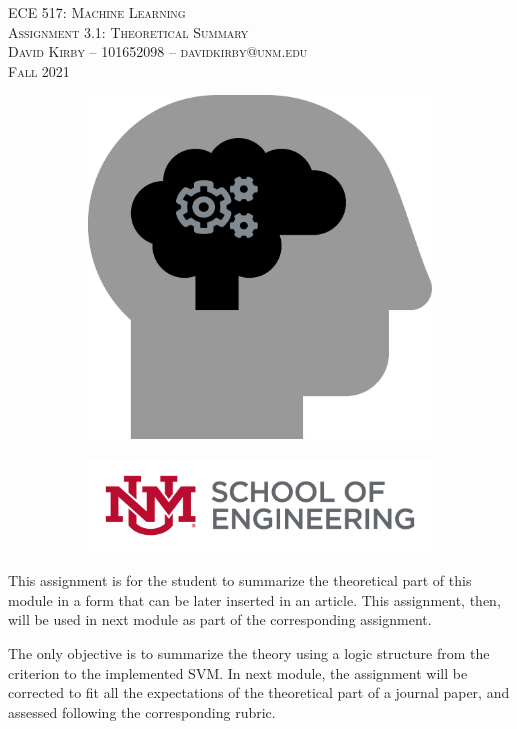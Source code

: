 \documentclass[11pt]{article}
\begin{document}
\setmainfont{SF Pro Text}
\setsansfont{SF Pro Text}
\setmonofont{SF Mono}
\renewcommand{\familydefault}{\sfdefault}


\thispagestyle{empty}
\begin{titlepage}
\vspace*{\fill}
\begin{center}
\textsc{\Huge{ECE 517: Machine Learning}}\\[3em]
\textsc{\LARGE Assignment 3.1: Theoretical Summary}\\[6em]
\textsc{\Large David Kirby -- 101652098 -- davidkirby@unm.edu}\\[3em]
\textsc{\Large Fall 2021}
\end{center}
\vfill
\begin{figure}[h]
\begin{subfigure}{0.5\textwidth}
\includegraphics[width=0.25\linewidth]{learning.png}
\end{subfigure}
\begin{subfigure}{0.6\textwidth}\hspace{1em}
\includegraphics[width=0.8\linewidth]{new-soe-logo.png}
\end{subfigure}
\end{figure}
\end{titlepage}
\setcounter{figure}{0}

\hypersetup{
    linkcolor=CrispBlue,
    urlcolor=CrispBlue,
    breaklinks=true
}

This assignment is for the student to summarize the theoretical part of this module in a form that can be later inserted in an article. This assignment, then, will be used in next module as part of the corresponding assignment. 

The only objective is to summarize the theory using a logic structure from the criterion to the implemented SVM. In next module, the assignment will be corrected to fit all the expectations of the theoretical part of a journal paper, and assessed following the corresponding rubric. 
\end{document}
